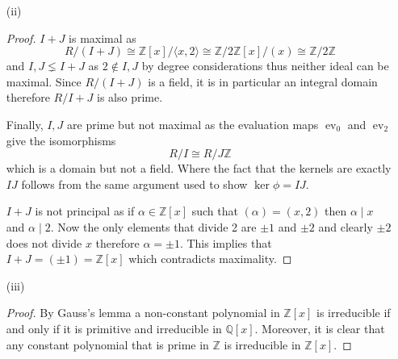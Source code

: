 \documentclass[12pt]{article}
\begin{document}
\begin{enumerate}
\begin{proof}
        Next $I \cap J = \langle x(x-2) \rangle$, as any polynomial in $I \cap J$ must be zero
        at $0$ and $2$ and by a similar argument to above this forces it to be divisible by $x(x-2)$.
        
        Finally, $IJ = \langle x(x-2) \rangle$ and this is clear as the product of two principal ideals
        is principal generated by the product of the generators.

        The map $R/IJ \to R/I \times R/J$ is not surjective as $(\overline{0}, \overline{1})$
        has no preimage in $R/IJ$ this is because if $f \in \mathbb Z[x]$ and modulo $I$, $f = 0$
        then $f(0) = 0$. However this implies that $f(2) = 0 \mod 2$. But $f(2) = 1 \mod J$
        so $f(x) = (x-2)p(x) + 1$ so $f(2) = 1$ which is a contradiction, thus no such $f$ exists.
    \end{proof}

    \item[(ii)]
    \begin{proof}
        $I + J$ is maximal as
        \[ R/(I + J) \cong \mathbb Z[x]/ \langle x, 2 \rangle \cong \mathbb Z/2\mathbb Z[x]/(x) \cong \mathbb Z/2\mathbb Z \]
        and $I, J \lneq I + J$ as $2 \notin I, J$ by degree considerations thus neither ideal can be maximal.
        Since $R/(I+J)$ is a field, it is in particular an integral domain therefore $R/I+J$ is also prime.

        Finally, $I, J$ are prime but not maximal as the evaluation maps $\operatorname{ev}_0$
        and $\operatorname{ev}_2$ give the isomorphisms
        \[ R/I \cong R/J \mathbb Z \]
        which is a domain but not a field. Where the fact that the kernels are exactly $IJ$
        follows from the same argument used to show $\ker \phi = IJ$.

        $I + J$ is not principal as if $\alpha \in \mathbb Z[x]$ such that $(\alpha) = (x, 2)$
        then $\alpha \mid x$ and $\alpha \mid 2$. Now the only elements that divide 2 are $\pm 1$ and $\pm 2$
        and clearly $\pm 2$ does not divide $x$ therefore $\alpha = \pm 1$. This implies that
        $I + J = (\pm 1) = \mathbb Z[x]$ which contradicts maximality.
    \end{proof}

    \item[(iii)]
    \begin{proof}
        By Gauss's lemma a non-constant polynomial in $\mathbb Z[x]$
        is irreducible if and only if it is primitive and irreducible in $\mathbb Q[x]$.
        Moreover, it is clear that any constant polynomial that is prime in $\mathbb Z$
        is irreducible in $\mathbb Z[x]$.


\end{proof}
\end{enumerate}
\end{document}
